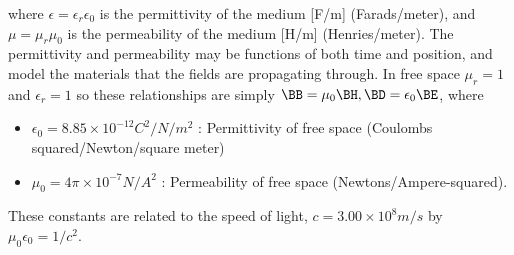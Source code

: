 where \( \epsilon = \epsilon_r \epsilon_0 \) is the permittivity of the medium [\si{F/m}] (Farads/meter), and \( \mu = \mu_r \mu_0 \) is the permeability of the medium [\si{H/m}] (Henries/meter).
The permittivity and permeability may be functions of both time and position, and model the materials that the fields are propagating through.
In free space \( \mu_r = 1 \) and \( \epsilon_r = 1\) so these relationships are simply
\( \BB = \mu_0 \BH, \BD = \epsilon_0 \BE \), where

%
%
\begin{itemize}
\item \( \epsilon_0 = 8.85 \times 10^{-12} \si{C^2/N/m^2}\) : Permittivity of free space (Coulombs squared/Newton/square meter)
\item \( \mu_0 = 4 \pi \times 10^{-7} \si{N/A^2}\) : Permeability of free space (Newtons/Ampere-squared).
\end{itemize}

These constants are related to the speed of light, \( c = 3.00 \times 10^8 \si{m/s} \) by \( \mu_0 \epsilon_0 = 1/c^2 \).


